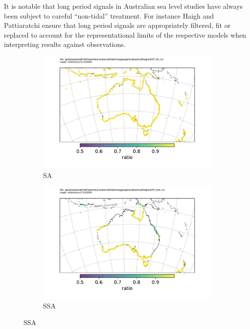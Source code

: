 It is notable that long period signals in Australian sea level studies have always been subject to careful ``non-tidal'' treatment. For instance Haigh \cite{Haigh:2013bn} and Pattiaratchi \cite{Pattiaratchi2018} ensure that long period signals are appropriately filtered, fit or replaced to account for the representational limits of the respective models when interpreting results against observations.

\begin{figure}[H]\centering
    \begin{subfigure}[b]{\figwidthHalf}
        \includegraphics[width=\textwidth]{figures/maps/AustRegionDiff_SA.pdf}
        \caption{SA}
    \end{subfigure}
    \begin{subfigure}[b]{\figwidthHalf}
        \includegraphics[width=\textwidth]{figures/maps/AustRegionDiff_SSA.pdf}
        \caption{SSA}

\end{subfigure}
\end{figure}
